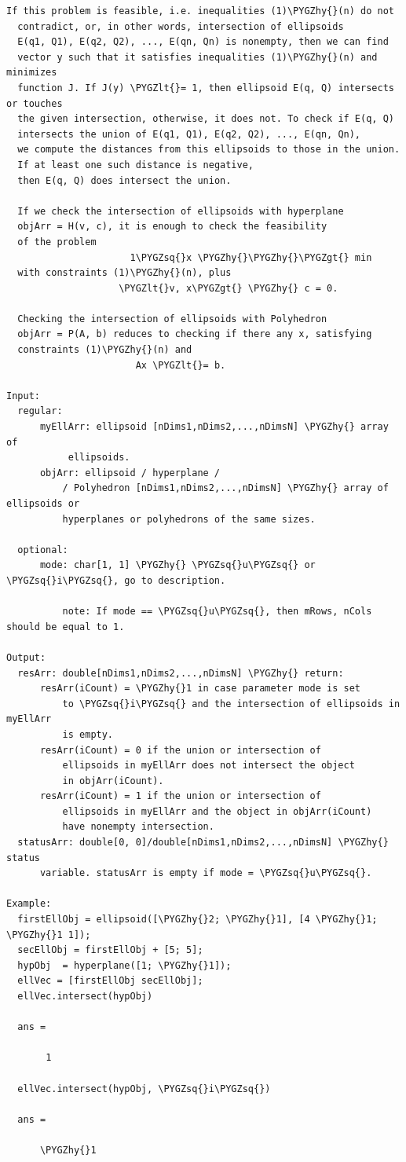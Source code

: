 \documentclass[letterpaper,10pt,english]{sphinxmanual}
\def\PYGZlt{\char`\<}
\def\PYGZgt{\char`\>}
\def\PYGZhy{\char`\-}
\def\PYGZsq{\char`\'}
\begin{document}
\begin{Verbatim}[commandchars=\\\{\}]
  If this problem is feasible, i.e. inequalities (1)\PYGZhy{}(n) do not
  contradict, or, in other words, intersection of ellipsoids
  E(q1, Q1), E(q2, Q2), ..., E(qn, Qn) is nonempty, then we can find
  vector y such that it satisfies inequalities (1)\PYGZhy{}(n) and minimizes
  function J. If J(y) \PYGZlt{}= 1, then ellipsoid E(q, Q) intersects or touches
  the given intersection, otherwise, it does not. To check if E(q, Q)
  intersects the union of E(q1, Q1), E(q2, Q2), ..., E(qn, Qn),
  we compute the distances from this ellipsoids to those in the union.
  If at least one such distance is negative,
  then E(q, Q) does intersect the union.

  If we check the intersection of ellipsoids with hyperplane
  objArr = H(v, c), it is enough to check the feasibility
  of the problem
                      1\PYGZsq{}x \PYGZhy{}\PYGZhy{}\PYGZgt{} min
  with constraints (1)\PYGZhy{}(n), plus
                    \PYGZlt{}v, x\PYGZgt{} \PYGZhy{} c = 0.

  Checking the intersection of ellipsoids with Polyhedron
  objArr = P(A, b) reduces to checking if there any x, satisfying
  constraints (1)\PYGZhy{}(n) and
                       Ax \PYGZlt{}= b.

Input:
  regular:
      myEllArr: ellipsoid [nDims1,nDims2,...,nDimsN] \PYGZhy{} array of
           ellipsoids.
      objArr: ellipsoid / hyperplane /
          / Polyhedron [nDims1,nDims2,...,nDimsN] \PYGZhy{} array of ellipsoids or
          hyperplanes or polyhedrons of the same sizes.

  optional:
      mode: char[1, 1] \PYGZhy{} \PYGZsq{}u\PYGZsq{} or \PYGZsq{}i\PYGZsq{}, go to description.

          note: If mode == \PYGZsq{}u\PYGZsq{}, then mRows, nCols should be equal to 1.

Output:
  resArr: double[nDims1,nDims2,...,nDimsN] \PYGZhy{} return:
      resArr(iCount) = \PYGZhy{}1 in case parameter mode is set
          to \PYGZsq{}i\PYGZsq{} and the intersection of ellipsoids in myEllArr
          is empty.
      resArr(iCount) = 0 if the union or intersection of
          ellipsoids in myEllArr does not intersect the object
          in objArr(iCount).
      resArr(iCount) = 1 if the union or intersection of
          ellipsoids in myEllArr and the object in objArr(iCount)
          have nonempty intersection.
  statusArr: double[0, 0]/double[nDims1,nDims2,...,nDimsN] \PYGZhy{} status
      variable. statusArr is empty if mode = \PYGZsq{}u\PYGZsq{}.

Example:
  firstEllObj = ellipsoid([\PYGZhy{}2; \PYGZhy{}1], [4 \PYGZhy{}1; \PYGZhy{}1 1]);
  secEllObj = firstEllObj + [5; 5];
  hypObj  = hyperplane([1; \PYGZhy{}1]);
  ellVec = [firstEllObj secEllObj];
  ellVec.intersect(hypObj)

  ans =

       1

  ellVec.intersect(hypObj, \PYGZsq{}i\PYGZsq{})

  ans =

      \PYGZhy{}1
\end{Verbatim}
\end{document}
